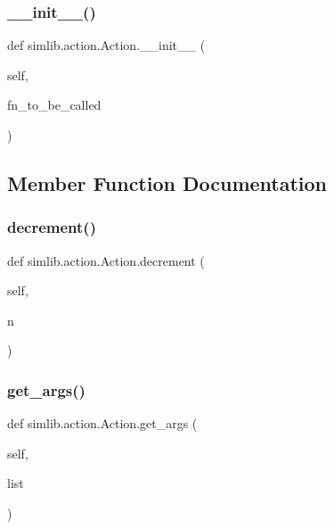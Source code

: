 \subsubsection{\texorpdfstring{\+\_\+\+\_\+init\+\_\+\+\_\+()}{\_\_init\_\_()}}
{\footnotesize\ttfamily def simlib.\+action.\+Action.\+\_\+\+\_\+init\+\_\+\+\_\+ (\begin{DoxyParamCaption}\item[{}]{self,  }\item[{}]{fn\+\_\+to\+\_\+be\+\_\+called }\end{DoxyParamCaption})}



\subsection{Member Function Documentation}
\mbox{\label{classsimlib_1_1action_1_1_action_ade5a713fac538d1c6c2db749e45368d4}} 
\subsubsection{\texorpdfstring{decrement()}{decrement()}}
{\footnotesize\ttfamily def simlib.\+action.\+Action.\+decrement (\begin{DoxyParamCaption}\item[{}]{self,  }\item[{}]{n }\end{DoxyParamCaption})}

\mbox{\label{classsimlib_1_1action_1_1_action_a50ced713bcfa576f7177455b4b1d6d33}} 
\subsubsection{\texorpdfstring{get\+\_\+args()}{get\_args()}}
{\footnotesize\ttfamily def simlib.\+action.\+Action.\+get\+\_\+args (\begin{DoxyParamCaption}\item[{}]{self,  }\item[{}]{list }\end{DoxyParamCaption})}

